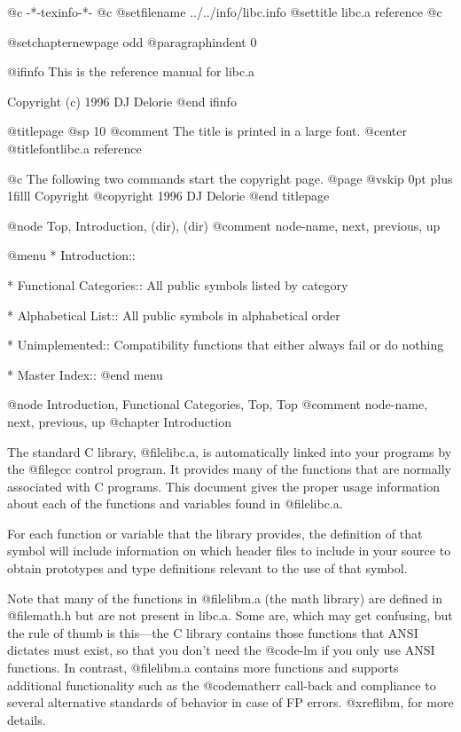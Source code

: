    @c -*-texinfo-*-
@c %
@setfilename ../../info/libc.info
@settitle libc.a reference
@c %

@setchapternewpage odd
@paragraphindent 0

@ifinfo
This is the reference manual for libc.a

Copyright (c) 1996 DJ Delorie
@end ifinfo

@titlepage
@sp 10
@comment The title is printed in a large font.
@center @titlefont{libc.a reference}

@c The following two commands start the copyright page.
@page
@vskip 0pt plus 1filll
Copyright @copyright{} 1996 DJ Delorie
@end titlepage

@node    Top,       Introduction,  (dir),    (dir)
@comment node-name, next,          previous, up

@menu
* Introduction::

* Functional Categories::  All public symbols listed by
                           category

* Alphabetical List::      All public symbols in alphabetical
                           order

* Unimplemented::          Compatibility functions that either
                           always fail or do nothing

* Master Index::
@end menu

@node    Introduction, Functional Categories, Top,      Top
@comment node-name,    next,                  previous, up
@chapter Introduction

The standard C library, @file{libc.a}, is automatically linked into your
programs by the @file{gcc} control program.  It provides many of the
functions that are normally associated with C programs.  This document
gives the proper usage information about each of the functions and
variables found in @file{libc.a}. 

For each function or variable that the library provides, the definition
of that symbol will include information on which header files to include
in your source to obtain prototypes and type definitions relevant to the
use of that symbol. 

Note that many of the functions in @file{libm.a} (the math library) are
defined in @file{math.h} but are not present in libc.a.  Some are, which
may get confusing, but the rule of thumb is this---the C library
contains those functions that ANSI dictates must exist, so that you
don't need the @code{-lm} if you only use ANSI functions.  In contrast,
@file{libm.a} contains more functions and supports additional
functionality such as the @code{matherr} call-back and compliance to
several alternative standards of behavior in case of FP errors.
@xref{libm}, for more details.

